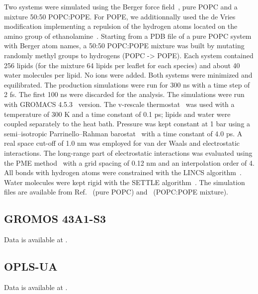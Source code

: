 \documentclass[journal=jpcbfk]{achemso}
\begin{document}
Two systems were simulated using the Berger force field~\cite{Berger97}, pure POPC and a mixture 50:50 POPC:POPE. For POPE, we additionnally used the de Vries modification implementing a repulsion of the hydrogen atoms located on the amino group of ethanolamine~\cite{devries04}.
Starting from a PDB file of a pure POPC system with Berger atom names, a 50:50 POPC:POPE mixture was built by mutating randomly methyl groups to hydrogens (POPC -> POPE). Each system contained 256 lipids (for the mixture 64 lipids per leaflet for each species) and about 40 water molecules per lipid. No ions were added. Both systems were minimized and equilibrated. The production simulations were run for 300 ns with a time step of 2 fs. The first 100 ns were discarded for the analysis. The simulations were run with GROMACS 4.5.3~\cite{pronk13} version. The v-rescale thermostat~\cite{bussi07} was used with a temperature of 300 K and a time constant of 0.1 ps; lipids and water were coupled separately to the heat bath. Pressure was kept constant at 1 bar using a semi–isotropic Parrinello–Rahman barostat~\cite{parrinello81} with a time constant of 4.0 ps. A real space cut-off of 1.0 nm was employed for van der Waals and electrostatic interactions. The long-range part of electrostatic interactions was evaluated using the PME method~\cite{darden93,essman95} with a grid spacing of 0.12 nm and an interpolation order of 4. All bonds with hydrogen atoms were constrained with the LINCS algorithm~\cite{hess07,hess97}. Water molecules were kept rigid with the SETTLE algorithm~\cite{miyamoto92}. The simulation files are available from
Ref.~ (pure POPC) and~ (POPC:POPE mixture).


\subsection{GROMOS 43A1-S3}

 Data is available at \cite{gromos43a1s3POPEfiles}. 

\subsection{OPLS-UA}

 Data is available at \cite{OPLSuaPOPEfiles}. 
\end{document}
